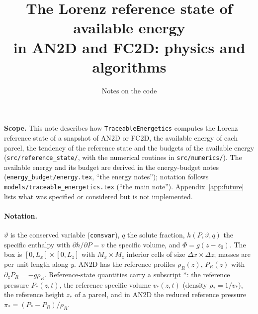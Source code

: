 \documentclass[11pt,a4paper]{article}
\title{The Lorenz reference state of available energy\\ in AN2D and FC2D: physics and algorithms}
\author{Notes on the \code{TraceableEnergetics} code}
\date{}
\newcommand{\vt}{\vartheta}
\newcommand{\code}[1]{\texttt{#1}}
\newcommand{\zs}{z_{*}}
\begin{document}
\maketitle
\tableofcontents

\bigskip
\noindent\textbf{Scope.}
This note describes how \code{TraceableEnergetics} computes the Lorenz reference state of a snapshot of AN2D or FC2D, the
available energy of each parcel, the tendency of the reference state and the budgets of the available energy
(\code{src/reference\_state/}, with the numerical routines in \code{src/numerics/}). The available energy and its budget are
derived in the energy-budget notes (\code{energy\_budget/energy.tex}, ``the energy notes''); notation follows
\code{models/traceable\_energetics.tex} (``the main note''). Appendix~\ref{app:future} lists what was specified or considered
but is not implemented.

\paragraph{Notation.} $\vt$ is the conserved variable (\code{consvar}), $q$ the solute fraction, $h(P,\vt,q)$ the specific
enthalpy with $\partial h/\partial P=v$ the specific volume, and $\Phi=g(z-z_0)$. The box is $[0,L_x]\times[0,L_z]$ with
$M_x\times M_z$ interior cells of size $\Delta x\times\Delta z$; masses are per unit length along $y$. AN2D has the reference
profiles $\rho_R(z)$, $P_R(z)$ with $\partial_zP_R=-g\rho_R$. Reference-state quantities carry a subscript $*$: the reference
pressure $P_*(z,t)$, the reference specific volume $v_*(z,t)$ (density $\rho_*=1/v_*$), the reference height $\zs$ of a
parcel, and in AN2D the reduced reference pressure $\pi_*=(P_*-P_R)/\rho_R$.

\end{document}
